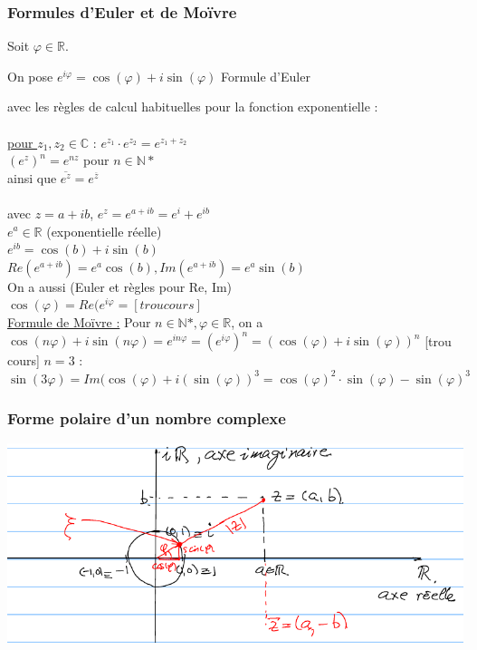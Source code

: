 \documentclass[12pt,a4paper]{article}
\newcommand{\R}{\ensuremath{\mathbb{R}} }
\newcommand{\N}{\ensuremath{\mathbb{N}} }
\begin{document}
{\subsubsection{Formules d'Euler et de Moïvre}
Soit $\varphi \in \R$. 
\begin{boite}[0.65]
On pose $e^{i\varphi} = \cos(\varphi) + i \sin(\varphi)$ Formule d'Euler
\end{boite}
avec les règles de calcul habituelles pour la fonction exponentielle :\\
\\
\underline{pour $z_1, z_2 \in \mathbb{C}$} : $e^{z_1} \cdot e^{z_2} = e^{z_1+z_2}$\\
$(e^z)^n = e^{nz}$ pour $n \in \N*$\\
ainsi que $\overline{e^z} = e^{\overline{z}}$\\
\\
avec $z = a +ib$, $e^z = e^{a+ib} = e^i + e^{ib}$\\
$e^a \in \R$ (exponentielle réelle)\\
$e^{ib} = \cos(b) + i\sin(b)$\\
$Re(e^{a+ib}) = e^a\cos(b ), Im(e^{a+ib}) = e^a\sin(b)$\\
On a aussi (Euler et règles pour Re, Im)\\
$\cos(\varphi) = Re(e^{i\varphi} = [trou cours]$\\
\underline{Formule de Moïvre :}
Pour $n \in \N*, \varphi \in \R$, on a\\
$\cos(n\varphi) + i\sin(n\varphi) = e^{i n \varphi} = (e^{i\varphi})^n = (\cos(\varphi) + i\sin(\varphi))^n$
[trou cours]
$n = 3$ : $\sin(3\varphi) = Im(\cos(\varphi) + i(\sin(\varphi))^3 = \cos(\varphi)^2\cdot \sin(\varphi) - \sin(\varphi)^3$
\subsubsection{Forme polaire d'un nombre complexe}
\includegraphics[scale=0.5]{illustrations_Analyse/cercle_polaire}

}
\end{document}
